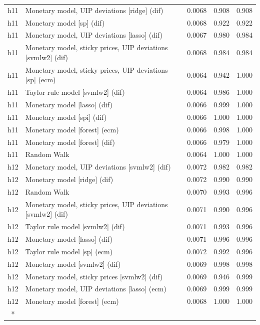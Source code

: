 \begin{ThreePartTable}
\begin{longtable}[t]{cp{5.5cm}ccc}
\addlinespace
h11 & \raggedright Monetary model, UIP deviations [ridge] (dif) & 0.0068 & 0.908 & 0.908\\
h11 & \raggedright Monetary model [sp] (dif) & 0.0068 & 0.922 & 0.922\\
h11 & \raggedright Monetary model, UIP deviations [lasso] (dif) & 0.0067 & 0.980 & 0.984\\
h11 & \raggedright Monetary model, sticky prices, UIP deviations [svmlw2] (dif) & 0.0068 & 0.984 & 0.984\\
h11 & \raggedright Monetary model, sticky prices, UIP deviations [sp] (ecm) & 0.0064 & 0.942 & 1.000\\
h11 & \raggedright Taylor rule model [svmlw2] (dif) & 0.0064 & 0.986 & 1.000\\
h11 & \raggedright Monetary model [lasso] (dif) & 0.0066 & 0.999 & 1.000\\
h11 & \raggedright Monetary model [spi] (dif) & 0.0066 & 1.000 & 1.000\\
h11 & \raggedright Monetary model [forest] (ecm) & 0.0066 & 0.998 & 1.000\\
h11 & \raggedright Monetary model [forest] (dif) & 0.0066 & 0.979 & 1.000\\
h11 & \raggedright Random Walk & 0.0064 & 1.000 & 1.000\\
\addlinespace
h12 & \raggedright Monetary model, UIP deviations [svmlw2] (dif) & 0.0072 & 0.982 & 0.982\\
h12 & \raggedright Monetary model [ridge] (dif) & 0.0072 & 0.990 & 0.990\\
h12 & \raggedright Random Walk & 0.0070 & 0.993 & 0.996\\
h12 & \raggedright Monetary model, sticky prices, UIP deviations [svmlw2] (dif) & 0.0071 & 0.990 & 0.996\\
h12 & \raggedright Taylor rule model [svmlw2] (dif) & 0.0071 & 0.993 & 0.996\\
h12 & \raggedright Monetary model [lasso] (dif) & 0.0071 & 0.996 & 0.996\\
h12 & \raggedright Taylor rule model [sp] (ecm) & 0.0072 & 0.992 & 0.996\\
h12 & \raggedright Monetary model [svmlw2] (dif) & 0.0069 & 0.998 & 0.998\\
h12 & \raggedright Monetary model, sticky prices [svmlw2] (dif) & 0.0069 & 0.946 & 0.999\\
h12 & \raggedright Monetary model, UIP deviations [lasso] (ecm) & 0.0069 & 0.999 & 0.999\\
h12 & \raggedright Monetary model [forest] (ecm) & 0.0068 & 1.000 & 1.000\\*
\end{longtable}
\end{ThreePartTable}
\endgroup{}
